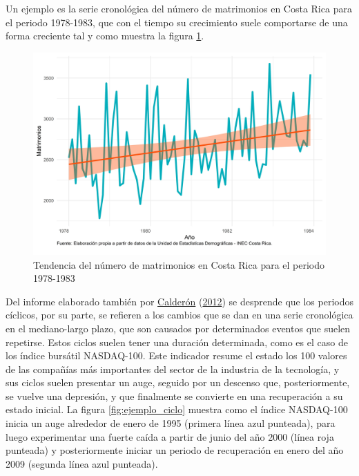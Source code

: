 \documentclass[
]{article}
\begin{document}
Un ejemplo es la serie cronológica del número de matrimonios en Costa
Rica para el periodo 1978-1983, que con el tiempo su crecimiento suele
comportarse de una forma creciente tal y como muestra la figura
\ref{fig:ejemplo_tendencia}.

\begin{figure}[!h]
\includegraphics[width=1\linewidth,height=1\textheight]{Tesis_files/figure-latex/ejemplo_tendencia-1} \caption{Tendencia del número de matrimonios en Costa Rica para el periodo 1978-1983}\label{fig:ejemplo_tendencia}
\end{figure}

Del informe elaborado también por
\protect\hyperlink{ref-calderon2012estadistica}{Calderón}
(\protect\hyperlink{ref-calderon2012estadistica}{2012}) se desprende que
los periodos cíclicos, por su parte, se refieren a los cambios que se
dan en una serie cronológica en el mediano-largo plazo, que son causados
por determinados eventos que suelen repetirse. Estos ciclos suelen tener
una duración determinada, como es el caso de los índice bursátil
NASDAQ-100. Este indicador resume el estado los 100 valores de las
compañías más importantes del sector de la industria de la tecnología, y
sus ciclos suelen presentar un auge, seguido por un descenso que,
posteriormente, se vuelve una depresión, y que finalmente se convierte
en una recuperación a su estado inicial. La figura
\ref{fig:ejemplo_ciclo} muestra como el índice NASDAQ-100 inicia un auge
alrededor de enero de 1995 (primera línea azul punteada), para luego
experimentar una fuerte caída a partir de junio del año 2000 (línea roja
punteada) y posteriormente iniciar un periodo de recuperación en enero
del año 2009 (segunda línea azul punteada).
\end{document}
